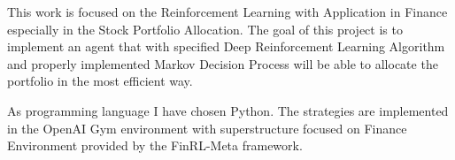 
This work is focused on the Reinforcement Learning with Application in Finance
especially in the Stock Portfolio Allocation.
The goal of this project is to implement an agent that with specified
Deep Reinforcement Learning Algorithm and properly implemented
Markov Decision Process will be able to allocate the portfolio in the
most efficient way.


As programming language I have chosen Python.
The strategies are implemented in the OpenAI Gym environment
with superstructure focused on Finance Environment
provided by the FinRL-Meta framework.



